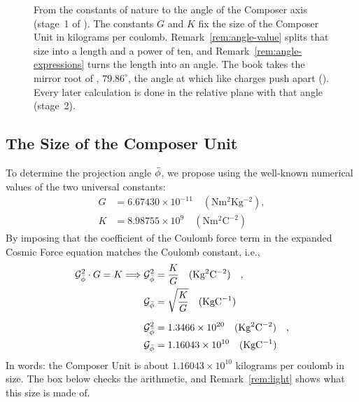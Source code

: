 \begin{figure}[tb]
\caption[From the constants of nature to the angle]{From the constants of nature to the angle of the Composer axis (stage~1 of ). The constants $G$ and $K$ fix the size of the Composer Unit in kilograms per coulomb. Remark~\ref{rem:angle-value} splits that size into a length and a power of ten, and Remark~\ref{rem:angle-expressions} turns the length into an angle. The book takes the mirror root of , $79.86^\circ$, the angle at which like charges push apart (). Every later calculation is done in the relative plane with that angle (stage~2).}
\label{fig:constants-angle}
\end{figure}

\subsection{The Size of the Composer Unit}\label{subsec:cu-size}

To determine the projection angle $\bar{\phi}$, we propose using the well-known numerical values of the two universal constants:
\begin{align*}
G &= 6.67430 \times 10^{-11} \quad (\mathrm{Nm^2Kg^{-2}}), \\
K &= 8.98755 \times 10^{9} \quad (\mathrm{Nm^2C^{-2}})
\end{align*}
By imposing that the coefficient of the Coulomb force term in the expanded Cosmic Force equation matches the Coulomb constant, i.e.,
\begin{align*}
\mathcal{G}_{\bar{\phi}}^2 \cdot G = K \Longrightarrow \mathcal{G}_{\bar{\phi}}^2 &= \frac{K}{G} \quad (\mathrm{Kg^2C^{-2}}) \quad , \\
\mathcal{G}_{\bar{\phi}} &= \sqrt{\frac{K}{G}} \quad (\mathrm{KgC^{-1}}) \\[6pt]
\mathcal{G}_{\bar{\phi}}^2 &= 1.3466 \times 10^{20} \quad (\mathrm{Kg^2C^{-2}}) \quad , \\
\mathcal{G}_{\bar{\phi}} &= 1.16043 \times 10^{10} \quad (\mathrm{KgC^{-1}})
\end{align*}
In words: the Composer Unit is about $1.16043 \times 10^{10}$ kilograms per coulomb in size. The box below checks the arithmetic, and Remark~\ref{rem:light} shows what this size is made of.

